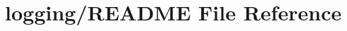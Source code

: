 \hypertarget{logging_2README}{\section{logging/\-R\-E\-A\-D\-M\-E File Reference}
\label{logging_2README}
}
